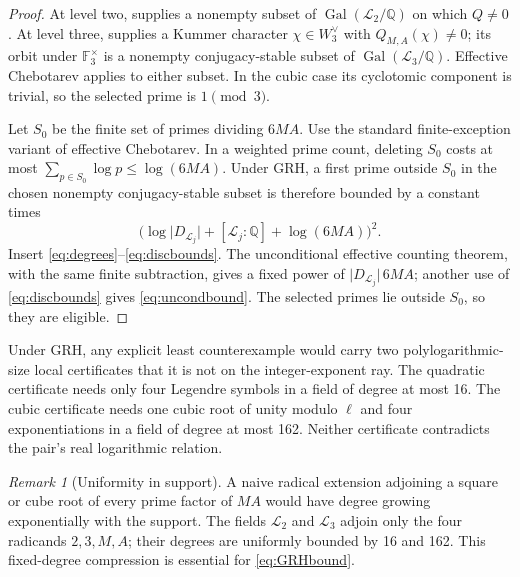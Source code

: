 \documentclass[11pt]{article}
\numberwithin{equation}{section}
\theoremstyle{definition}
\theoremstyle{remark}
\newtheorem{remark}[theorem]{Remark}
\newcommand{\Q}{\mathbb Q}
\newcommand{\F}{\mathbb F}
\newcommand{\Gal}{\operatorname{Gal}}
\newcommand{\abs}[1]{\lvert#1\rvert}
\begin{document}
\begin{proof}
At level two,  supplies a nonempty subset of
\(\Gal(\mathcal L_2/\Q)\) on which \(Q\ne0\).  At level three,
 supplies a Kummer character \(\chi\in W_3^\vee\) with
\(Q_{M,A}(\chi)\ne0\); its orbit under \(\F_3^\times\) is a nonempty conjugacy-stable subset
of \(\Gal(\mathcal L_3/\Q)\).  Effective Chebotarev
\cite{LagariasOdlyzko,GrenieMolteni,ThornerZaman,KadiriWong} applies to either subset.  In the
cubic case its cyclotomic component is trivial, so the selected prime is
\(1\pmod3\).

Let \(S_0\) be the finite set of primes dividing \(6MA\).  Use the standard finite-exception
variant of effective Chebotarev.  In a weighted prime count, deleting \(S_0\) costs at most
\(\sum_{p\in S_0}\log p\le\log(6MA)\).  Under GRH, a first prime outside \(S_0\) in the
chosen nonempty conjugacy-stable subset is therefore bounded by a constant times
\[
 \bigl(\log\abs{D_{\mathcal L_j}}+[\mathcal L_j:\Q]+\log(6MA)\bigr)^2.
\]
Insert \eqref{eq:degrees}--\eqref{eq:discbounds}.  The unconditional effective counting
theorem, with the same finite subtraction, gives a fixed power of
\(\abs{D_{\mathcal L_j}}\,6MA\); another use of \eqref{eq:discbounds} gives
\eqref{eq:uncondbound}.  The selected primes lie outside \(S_0\), so they are eligible.
\end{proof}

\begin{resultbox}[Interpretation]
Under GRH, any explicit least counterexample would carry two polylogarithmic-size local
certificates that it is not on the integer-exponent ray.  The quadratic certificate needs only
four Legendre symbols in a field of degree at most 16.  The cubic certificate needs one cubic
root of unity modulo \(\ell\) and four exponentiations in a field of degree at most 162.
Neither certificate contradicts the pair's real logarithmic relation.
\end{resultbox}

\begin{remark}[Uniformity in support]
A naive radical extension adjoining a square or cube root of every prime factor of \(MA\)
would have degree growing exponentially with the support.  The fields \(\mathcal L_2\) and
\(\mathcal L_3\) adjoin only the four radicands \(2,3,M,A\); their degrees are uniformly
bounded by 16 and 162.  This fixed-degree compression is essential for \eqref{eq:GRHbound}.
\end{remark}
\end{document}
